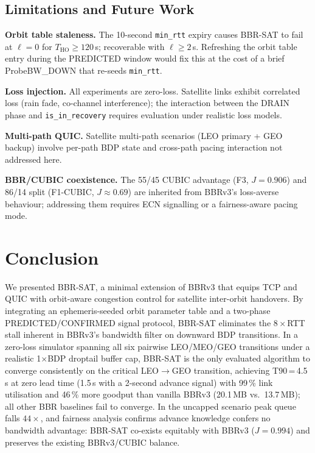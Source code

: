 \documentclass[conference]{IEEEtran}
\begin{document}
\subsection{Limitations and Future Work}

\textbf{Orbit table staleness.}
The 10-second \texttt{min\_rtt} expiry causes BBR-SAT to fail at $\ell = 0$
for $T_\mathrm{HO} \geq 120$\,s; recoverable with $\ell \geq 2$\,s.
Refreshing the orbit table entry during the PREDICTED window would fix this
at the cost of a brief ProbeBW\_DOWN that re-seeds \texttt{min\_rtt}.

\textbf{Loss injection.}
All experiments are zero-loss.
Satellite links exhibit correlated loss (rain fade, co-channel interference);
the interaction between the DRAIN phase and \texttt{is\_in\_recovery}
requires evaluation under realistic loss models.

\textbf{Multi-path QUIC.}
Satellite multi-path scenarios (LEO primary + GEO backup) involve
per-path BDP state and cross-path pacing interaction not addressed here.

\textbf{BBR/CUBIC coexistence.}
The 55/45 CUBIC advantage (F3, $J = 0.906$) and 86/14 split (F1-CUBIC,
$J \approx 0.69$) are inherited from BBRv3's loss-averse behaviour;
addressing them requires ECN signalling or a fairness-aware pacing mode.

\section{Conclusion}
\label{sec:conclusion}

We presented BBR-SAT, a minimal extension of BBRv3 that equips TCP and QUIC
with orbit-aware congestion control for satellite inter-orbit handovers.
By integrating an ephemeris-seeded orbit parameter table and a two-phase
PREDICTED/CONFIRMED signal protocol, BBR-SAT eliminates the $8 \times$RTT
stall inherent in BBRv3's bandwidth filter on downward BDP transitions.
In a zero-loss simulator spanning all six pairwise LEO/MEO/GEO transitions
under a realistic 1$\times$BDP droptail buffer cap,
BBR-SAT is the only evaluated algorithm to converge consistently on the
critical LEO$\to$GEO transition, achieving T90\,=\,4.5\,s at zero lead
time (1.5\,s with a 2-second advance signal) with 99\,\% link utilisation
and 46\,\% more goodput than vanilla BBRv3 (20.1\,MB vs.\ 13.7\,MB);
all other BBR baselines fail to converge.
In the uncapped scenario peak queue falls $44\times$, and fairness
analysis confirms advance knowledge confers no bandwidth advantage:
BBR-SAT co-exists equitably with BBRv3 ($J = 0.994$) and preserves
the existing BBRv3/CUBIC balance.



\end{document}
